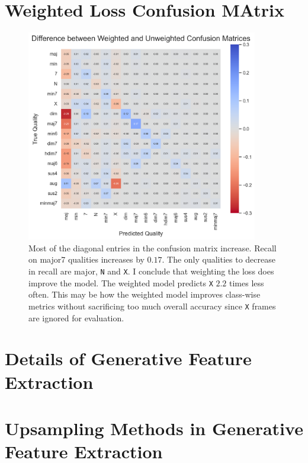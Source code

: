 \section{Weighted Loss Confusion MAtrix}\label{app:weighted_loss_confusion_matrix}

\begin{figure}[H]
    \centering
    \hspace{-1.5cm}
    \includegraphics[width=0.9\textwidth]{figures/confusion_matrix_difference.png}
    \caption{ Most of the diagonal entries in the confusion matrix increase. Recall on major7 qualities increases by $0.17$. The only qualities to decrease in recall are major, \texttt{N} and \texttt{X}. I conclude that weighting the loss does improve the model. The weighted model predicts \texttt{X} $2.2$ times less often. This may be how the weighted model improves class-wise metrics without sacrificing too much overall accuracy since \texttt{X} frames are ignored for evaluation.}\label{fig:hmm_smoothing_example}
\end{figure}

\section{Details of Generative Feature Extraction}\label{app:generative_feature_extraction}

\section{Upsampling Methods in Generative Feature Extraction}\label{app:linear_interpolation_vs_area_averaging}

